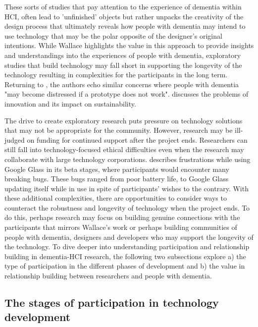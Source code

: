 These sorts of studies that pay attention to the experience of dementia within HCI, often lead to 'unfinished' objects but rather unpacks the creativity of the design process that ultimately reveals how people with dementia may intend to use technology that may be the polar opposite of the designer's original intentions. While Wallace highlights the value in this approach to provide insights and understandings into the experiences of people with dementia, exploratory studies that build technology may fall short in supporting the longevity of the technology resulting in complexities for the participants in the long term. Returning to \cite{robinson2009keeping}, the authors echo similar concerns where people with dementia "may become distressed if a prototype does not work". \cite{meurer_designing_2018} discusses the problems of innovation and its impact on sustainability. 

The drive to create exploratory research puts pressure on technology solutions that may not be appropriate for the community. However, research may be ill-judged on funding for continued support after the project ends. Researchers can still fall into technology-focused ethical difficulties even when the research may collaborate with large technology corporations. \cite{vines_our_2017} describes frustrations while using Google Glass in its beta stages, where participants would encounter many breaking bugs. These bugs ranged from poor battery life, to Google Glass updating itself while in use in spite of participants' wishes to the contrary. With these additional complexities, there are opportunities to consider ways to counteract the robustness and longevity of technology when the project ends. To do this, perhaps research may focus on building genuine connections with the participants that mirrors Wallace's work or perhaps building communities of people with dementia, designers and developers who may support the longevity of the technology. To dive deeper into understanding participation and relationship building in dementia-HCI research, the following two subsections explore a) the type of participation in the different phases of development and b) the value in relationship building between researchers and people with dementia.

\subsection{The stages of participation in technology development}
\label{BL:StagesofTech}

